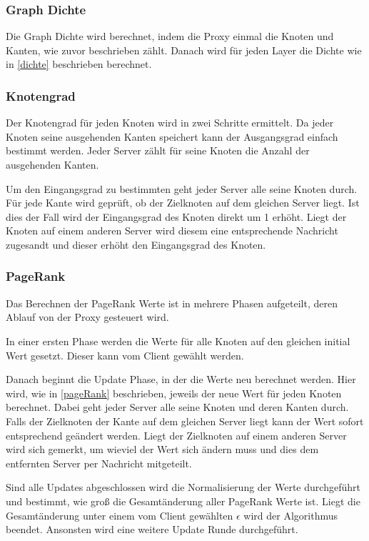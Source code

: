 \subsubsection{Graph Dichte}

Die Graph Dichte wird berechnet, indem die Proxy einmal die Knoten und Kanten, wie zuvor beschrieben zählt.
Danach wird für jeden Layer die Dichte wie in \ref{dichte} beschrieben berechnet.


\subsubsection{Knotengrad}

Der Knotengrad für jeden Knoten wird in zwei Schritte ermittelt.
Da jeder Knoten seine ausgehenden Kanten speichert kann der Ausgangsgrad einfach bestimmt werden. Jeder Server zählt für seine Knoten die Anzahl der ausgehenden Kanten.

Um den Eingangsgrad zu bestimmten geht jeder Server alle seine Knoten durch. Für jede Kante wird geprüft, ob der Zielknoten auf dem gleichen Server liegt. Ist dies der Fall wird der Eingangsgrad des Knoten direkt um 1 erhöht.
Liegt der Knoten auf einem anderen Server wird diesem eine entsprechende Nachricht zugesandt und dieser erhöht den Eingangsgrad des Knoten.


\subsubsection{PageRank}

Das Berechnen der PageRank Werte ist in mehrere Phasen aufgeteilt, deren Ablauf von der Proxy gesteuert wird.

In einer ersten Phase werden die Werte für alle Knoten auf den gleichen initial Wert gesetzt. Dieser kann vom Client gewählt werden.

Danach beginnt die Update Phase, in der die Werte neu berechnet werden. Hier wird, wie in \ref{pageRank} beschrieben, jeweils der neue Wert für jeden Knoten berechnet.
Dabei geht jeder Server alle seine Knoten und deren Kanten durch. Falls der Zielknoten der Kante auf dem gleichen Server liegt kann der Wert sofort entsprechend geändert werden.
Liegt der Zielknoten auf einem anderen Server wird sich gemerkt, um wieviel der Wert sich ändern muss und dies dem entfernten Server per Nachricht mitgeteilt.


Sind alle Updates abgeschlossen wird die Normalisierung der Werte durchgeführt und bestimmt, wie groß die Gesamtänderung aller PageRank Werte ist.
Liegt die Gesamtänderung unter einem vom Client gewählten $\epsilon$ wird der Algorithmus beendet. Ansonsten wird eine weitere Update Runde durchgeführt.


